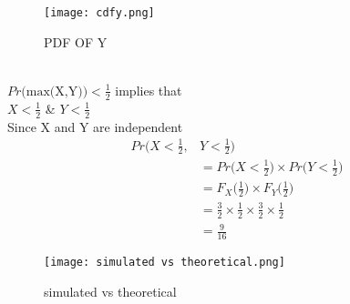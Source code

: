 \documentclass[11pt,a4paper,twocolumn]{article}
\begin{document}
\begin{figure}[hbt!]
    \centering
    \texttt{[image: cdfy.png]}
    \caption{PDF OF Y}
\end{figure}\\
$Pr\Big(\text{max(X,Y)}\Big)<\frac{1}{2}$ implies that\\[5pt]
$X<\frac{1}{2}$ \& $Y<\frac{1}{2}$\\
Since X and Y are independent
\begin{align*}
    Pr\Bigg(X<\frac{1}{2},&Y<\frac{1}{2}\Bigg)\\
    &=Pr\Big(X<\frac{1}{2}\Big)\times Pr\Big(Y<\frac{1}{2}\Big)\\
    &=F_X\Bigg(\frac{1}{2}\Bigg) \times F_Y\Bigg(\frac{1}{2}\Bigg)\\
   &=\frac{3}{2}\times\frac{1}{2}\times\frac{3}{2}\times\frac{1}{2}\\
    &=\frac{9}{16}
\end{align*}
\begin{figure}[h!]
    \centering
    \texttt{[image: simulated vs theoretical.png]}
    \caption{simulated vs theoretical}
    \label{fig:my_label}
\end{figure}
\end{document}
